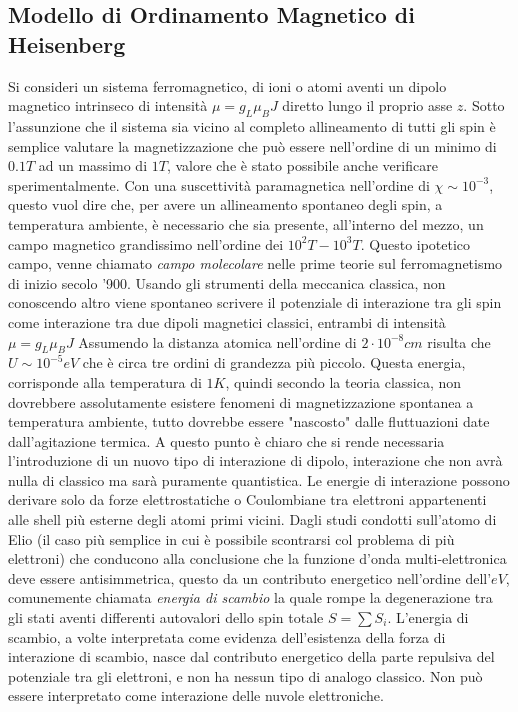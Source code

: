 \subsection{Modello di Ordinamento Magnetico di Heisenberg}
Si consideri un sistema ferromagnetico, di ioni o atomi aventi un dipolo magnetico intrinseco di intensit\`a $\mu = g_L\mu_BJ$ diretto lungo il proprio asse $z$. Sotto l'assunzione che il sistema sia vicino al completo allineamento di tutti gli spin \`e semplice valutare la magnetizzazione che pu\`o essere nell'ordine di un minimo di $0.1T$ ad un massimo di $1T$, valore che \`e stato possibile anche verificare sperimentalmente. Con una suscettivit\`a paramagnetica nell'ordine di $\chi \sim 10^{-3}$, questo vuol dire che, per avere un allineamento spontaneo degli spin, a temperatura ambiente, \`e necessario che sia presente, all'interno del mezzo, un campo magnetico grandissimo nell'ordine dei $10^2T - 10^3T$. Questo ipotetico campo, venne chiamato \textit{campo molecolare} nelle prime teorie sul ferromagnetismo di inizio secolo '900. 
Usando gli strumenti della meccanica classica, non conoscendo altro viene spontaneo scrivere il potenziale di interazione tra gli spin come interazione tra due dipoli magnetici classici, entrambi di intensit\`a $\mu=g_L\mu_BJ$
Assumendo la distanza atomica nell'ordine di $2\cdot10^{-8}cm$ risulta che $U\sim10^{-5} eV$ che \`e circa tre ordini di grandezza pi\`u piccolo. Questa energia, corrisponde alla temperatura di $1K$, quindi secondo la teoria classica, non dovrebbere assolutamente esistere fenomeni di magnetizzazione spontanea a temperatura ambiente, tutto dovrebbe essere "nascosto" dalle fluttuazioni date dall'agitazione termica. A questo punto \`e chiaro che si rende necessaria l'introduzione di un nuovo tipo di interazione di dipolo, interazione che non avr\`a nulla di classico ma sar\`a puramente quantistica. Le energie di interazione possono derivare solo da forze elettrostatiche o Coulombiane tra elettroni appartenenti alle shell pi\`u esterne degli atomi primi vicini. Dagli studi condotti sull'atomo di Elio (il caso pi\`u semplice in cui \`e possibile scontrarsi col problema di pi\`u elettroni) che conducono alla conclusione che la funzione d'onda multi-elettronica deve essere antisimmetrica, questo da un contributo energetico nell'ordine dell'$eV$, comunemente chiamata \textit{energia di scambio} la quale rompe la degenerazione tra gli stati aventi differenti autovalori dello spin totale $S = \sum S_i$. L'energia di scambio, a volte interpretata come evidenza dell'esistenza della forza di interazione di scambio, nasce dal contributo energetico della parte repulsiva del potenziale tra gli elettroni, e non ha nessun tipo di analogo classico. Non pu\`o essere interpretato come interazione delle nuvole elettroniche.
